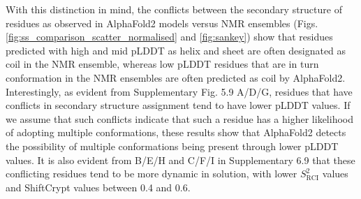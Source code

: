 With this distinction in mind, the conflicts between the secondary structure of residues as observed in AlphaFold2 models versus NMR ensembles (Figs. \ref{fig:ss_comparison_scatter_normalised} and \ref{fig:sankey}) show that residues predicted with high and mid pLDDT as helix and sheet are often designated as coil in the NMR ensemble, whereas low pLDDT residues that are in turn conformation in the NMR ensembles are often predicted as coil by AlphaFold2. Interestingly, as evident from 
Supplementary Fig. 5.9 A/D/G, residues that have conflicts in secondary structure assignment tend to have lower pLDDT values. If we assume that such conflicts indicate that such a residue has a higher likelihood of adopting multiple conformations, these results show that AlphaFold2 detects the possibility of multiple conformations being present through lower pLDDT values. It is also evident from B/E/H and C/F/I in Supplementary 6.9
that these conflicting residues tend to be more dynamic in solution, with lower $S^{2}_{\text{RCI}}$ values and ShiftCrypt values between 0.4 and 0.6.

